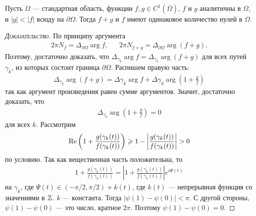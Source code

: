 \documentclass[../../main.tex]{subfiles}
\begin{document}
\begin{thm}[Руше]
 Пусть $ \Omega $ --- стандартная область, функции $ f,g \in C^{1}(\overline\Omega) $, $ f $ и $ g $ аналитичны в $ \Omega $, и $ \left| g \right| < \left| f \right| $ всюду на $ \partial \Omega $. Тогда $ f + g $ и $ f $ имеют одинаковое количество нулей в $ \Omega $.
\end{thm}
\begin{proof}[\normalfont\textsc{Доказательство}]
 По принципу аргумента
 \begin{align*} 2\pi N_f = \Delta_{\partial\Omega} \arg f, && 2\pi N_{f+g} = \Delta_{\partial\Omega}\arg(f+g).
 \end{align*} Поэтому, достаточно доказать, что $ \Delta_{\gamma_k} \arg f = \Delta_{\gamma_k} \arg (f+g) $ для всех путей $ \gamma_k $, из которых состоит граница $ \partial\Omega $. Распишем правую часть:
 \begin{align*}
  \Delta_{\gamma_k} \arg (f+g)  = \Delta{\gamma_k} \arg f + \Delta{\gamma_k} \arg \left( 1 + \frac{g}{f}\right)
 \end{align*} так как аргумент произведения равен сумме аргументов. Значит, достаточно доказать, что
 \begin{align*}
  \Delta_{\gamma_k} \arg \left( 1 + \frac{g}{f} \right) = 0
 \end{align*} для всех $ k $. Рассмотрим 
 \begin{align*}
  \operatorname{Re} \left(1 + \frac{g(\gamma_k(t))}{f(\gamma_k(t))}\right) \geqslant 1 - \left| \frac{g(\gamma_k(t))}{f(\gamma_k(t))} \right| > 0
 \end{align*} по условию. Так как вещественная часть положительна, то
 \begin{align*}
  1 + \frac{g(\gamma_k(t))}{f(\gamma_k(t))} = \left| 1 + \frac{g(\gamma_k(t))}{f(\gamma_k(t))} \right|e^{i\Psi(t)}
 \end{align*} на $ \gamma_k $, где $ \Psi(t) \in (-\pi / 2, \pi / 2) + k(t)  $, где $ k(t) $ --- непрерывная функция со значениями в $ \mathbb{Z} $. $ k $ --- константа. Тогда $ \left|\psi(1) - \psi(0) \right| < \pi $. С другой стороны, $ \psi(1) - \psi(0) $ --- это число, кратное $ 2\pi $. Поэтому $ \psi(1) - \psi(0) = 0 $.
\end{proof}
\end{document}
